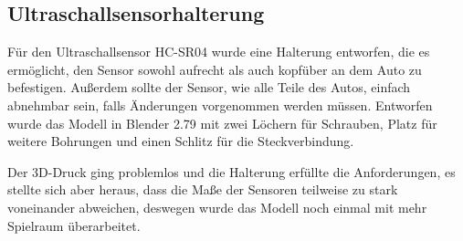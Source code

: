 \documentclass[a4paper, 12pt]{scrartcl}
\begin{document}
\subsection{Ultraschallsensorhalterung}

Für den Ultraschallsensor HC-SR04 wurde eine Halterung entworfen, die es ermöglicht, den Sensor sowohl aufrecht als auch kopfüber an dem Auto zu befestigen. Außerdem sollte der Sensor, wie alle Teile des Autos, einfach abnehmbar sein, falls Änderungen vorgenommen werden müssen. Entworfen wurde das Modell in Blender 2.79 mit zwei Löchern für Schrauben, Platz für weitere Bohrungen und einen Schlitz für die Steckverbindung.

Der 3D-Druck ging problemlos und die Halterung erfüllte die Anforderungen, es stellte sich aber heraus, dass die Maße der Sensoren teilweise zu stark voneinander abweichen, deswegen wurde das Modell noch einmal mit mehr Spielraum überarbeitet.
\end{document}

